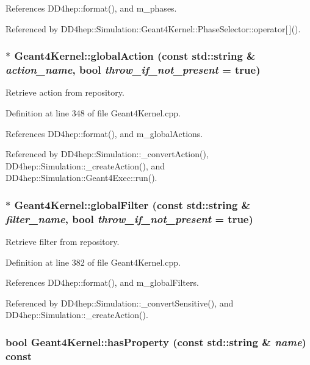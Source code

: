 References DD4hep::format(), and m\_\-phases.

Referenced by DD4hep::Simulation::Geant4Kernel::PhaseSelector::operator\mbox{[}$\,$\mbox{]}().\hypertarget{class_d_d4hep_1_1_simulation_1_1_geant4_kernel_a9142233acf94a391ef926eee86b04c26}{
\subsubsection[{globalAction}]{ $\ast$ Geant4Kernel::globalAction (const std::string \& {\em action\_\-name}, \/  bool {\em throw\_\-if\_\-not\_\-present} = {\ttfamily true})}}
\label{class_d_d4hep_1_1_simulation_1_1_geant4_kernel_a9142233acf94a391ef926eee86b04c26}


Retrieve action from repository. 

Definition at line 348 of file Geant4Kernel.cpp.

References DD4hep::format(), and m\_\-globalActions.

Referenced by DD4hep::Simulation::\_\-convertAction(), DD4hep::Simulation::\_\-createAction(), and DD4hep::Simulation::Geant4Exec::run().\hypertarget{class_d_d4hep_1_1_simulation_1_1_geant4_kernel_ad6b6f410f168992639e4fe3fa9fc2c73}{
\subsubsection[{globalFilter}]{ $\ast$ Geant4Kernel::globalFilter (const std::string \& {\em filter\_\-name}, \/  bool {\em throw\_\-if\_\-not\_\-present} = {\ttfamily true})}}
\label{class_d_d4hep_1_1_simulation_1_1_geant4_kernel_ad6b6f410f168992639e4fe3fa9fc2c73}


Retrieve filter from repository. 

Definition at line 382 of file Geant4Kernel.cpp.

References DD4hep::format(), and m\_\-globalFilters.

Referenced by DD4hep::Simulation::\_\-convertSensitive(), and DD4hep::Simulation::\_\-createAction().\hypertarget{class_d_d4hep_1_1_simulation_1_1_geant4_kernel_a615765e129ae5076af6f58e40540c977}{
\subsubsection[{hasProperty}]{\setlength{\rightskip}{0pt plus 5cm}bool Geant4Kernel::hasProperty (const std::string \& {\em name}) const}}
\label{class_d_d4hep_1_1_simulation_1_1_geant4_kernel_a615765e129ae5076af6f58e40540c977}


